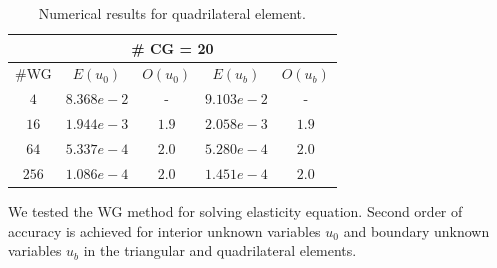	
	\begin{table}[h]
		\setlength{\tabcolsep}{2pt} {
			\caption{ Numerical results for quadrilateral element.}
			\label{Tab:hwgcg l1}
			\vspace{-5pt}
			\begin{center}
				\begin{tabular}{c|c|c|c|c}
					\hline
					\multicolumn{5}{c}{\# CG = 20} \\
					\hline
					\#WG & $ E (u_{0}) $ & $ O(u_{0}) $ & $ E(u_{b})  $& $ O(u_{b})  $\\
					\hline
					$ 4 $ & $ 8.368e-2 $ & - & $ 9.103e-2 $ & - \\
					\hline
					$ 16 $ & $ 1.944e-3 $ & $ 1.9 $& $ 2.058e-3 $ & $ 1.9 $ \\
					\hline
					$ 64 $ & $ 5.337e-4 $ & $ 2.0 $ & $ 5.280e-4 $ & $ 2.0 $ \\
					\hline
					$ 256 $ & $ 1.086e-4 $ & $ 2.0 $ & $ 1.451e-4 $ & $ 2.0 $\\
					\hline
				\end{tabular}
			\end{center} }
		\end{table}
		
		\vspace{5mm}
		
		We tested the WG method for solving elasticity equation. Second order of accuracy is achieved for interior unknown variables $ u_0 $ and boundary unknown variables $ u_b $ in the triangular and quadrilateral elements.

